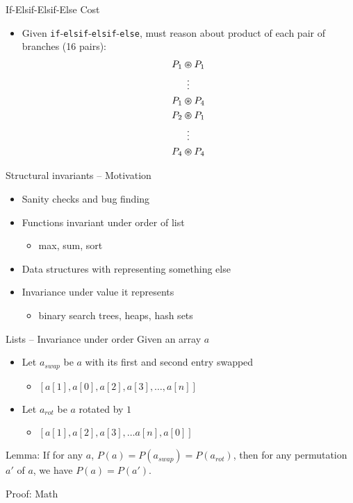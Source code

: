 \documentclass[usenames,dvipsnames]{beamer}
\begin{document}
\begin{frame}[fragile]{If-Elsif-Elsif-Else Cost}
    \begin{itemize}
        \item<1-> Given \verb!if!-\verb!elsif!-\verb!elsif!-\verb!else!, must reason about product of each pair of branches (16 pairs):
        \begin{gather*}
        P_{1} \varoast P_{1}\\
        \vdots\\
        P_{1} \varoast P_{4}\\
        P_{2} \varoast P_{1}\\
        \vdots\\
        P_{4} \varoast P_{4}
        \end{gather*}
    \end{itemize}
\end{frame}

\begin{frame}[fragile]{Structural invariants -- Motivation}
  \begin{itemize}
    \item Sanity checks and bug finding
    \vfill
    \item Functions invariant under order of list
    \begin{itemize}
      \item max, sum, sort
    \end{itemize}
    \vfill
    \item Data structures with representing something else
    \item Invariance under value it represents
    \begin{itemize}
      \item binary search trees, heaps, hash sets
    \end{itemize}
  \end{itemize}
\end{frame}

\begin{frame}[fragile]{Lists -- Invariance under order}
  Given an array $a$
  \begin{itemize}
    \item Let $a_{swap}$ be $a$ with its first and second entry swapped
    \begin{itemize}
      \item $[ a[1], a[0], a[2], a[3], \ldots, a[n] ]$
    \end{itemize}
    \item Let $a_{rot}$ be $a$ rotated by $1$
    \begin{itemize}
      \item $[ a[1], a[2], a[3], \ldots  a[n], a[0] ]$
    \end{itemize}
  \end{itemize}
  \vfill
  Lemma: If for any $a$, $P(a) = P(a_{swap}) = P(a_{rot})$,
  then for any permutation $a'$ of $a$,
  we have $P(a) = P(a')$.

  Proof: Math
\end{frame}
\end{document}
